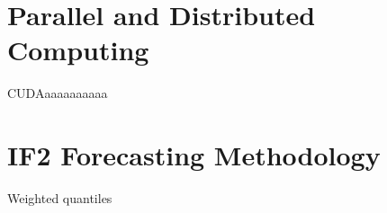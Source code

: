 \section{Parallel and Distributed Computing}

	CUDAaaaaaaaaaa

	\lipsum[5-6]

\section{IF2 Forecasting Methodology}

	Weighted quantiles

	\lipsum[7-8]